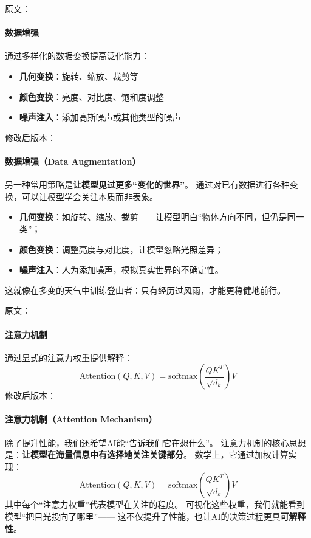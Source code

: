 原文：
\paragraph{数据增强}
通过多样化的数据变换提高泛化能力：
\begin{itemize}
\item \textbf{几何变换}：旋转、缩放、裁剪等
\item \textbf{颜色变换}：亮度、对比度、饱和度调整
\item \textbf{噪声注入}：添加高斯噪声或其他类型的噪声
\end{itemize}
修改后版本：
\paragraph{数据增强（Data Augmentation）}  
另一种常用策略是\textbf{让模型见过更多“变化的世界”}。  
通过对已有数据进行各种变换，可以让模型学会关注本质而非表象。  

\begin{itemize}
\item \textbf{几何变换}：如旋转、缩放、裁剪——让模型明白“物体方向不同，但仍是同一类”；  
\item \textbf{颜色变换}：调整亮度与对比度，让模型忽略光照差异；  
\item \textbf{噪声注入}：人为添加噪声，模拟真实世界的不确定性。  
\end{itemize}
这就像在多变的天气中训练登山者：只有经历过风雨，才能更稳健地前行。



原文：
\paragraph{注意力机制}
通过显式的注意力权重提供解释：
$$\text{Attention}(Q, K, V) = \text{softmax}\left(\frac{QK^T}{\sqrt{d_k}}\right)V$$
修改后版本：
\paragraph{注意力机制（Attention Mechanism）}  
除了提升性能，我们还希望AI能“告诉我们它在想什么”。  
注意力机制的核心思想是：\textbf{让模型在海量信息中有选择地关注关键部分}。  
数学上，它通过加权计算实现：  
$$\text{Attention}(Q,K,V)=\text{softmax}\left(\frac{QK^T}{\sqrt{d_k}}\right)V$$  
其中每个“注意力权重”代表模型在关注的程度。  
可视化这些权重，我们就能看到模型“把目光投向了哪里”——  
这不仅提升了性能，也让AI的决策过程更具\textbf{可解释性}。



